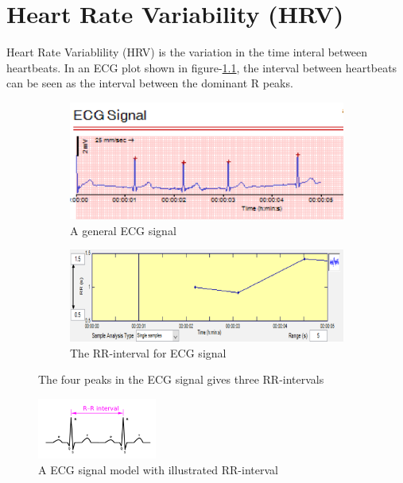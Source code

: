 \documentclass[a4paper, 11pt]{report}\usepackage[]{graphicx}\usepackage[]{color}
\numberwithin{figure}{section}
\begin{document}
\chapter{Heart Rate Variability (HRV)}
Heart Rate Variablility (HRV) is the variation in the time interal between heartbeats. In an ECG plot shown in figure-\ref{fig:ecgSignal}, the interval between heartbeats can be seen as the interval between the dominant R peaks.
\begin{figure}[H]
\centering
\begin{subfigure}[b]{0.49\textwidth}
  \includegraphics[width = \textwidth]{figure/ecg-1}
  \caption{A general ECG signal}
\end{subfigure}
\begin{subfigure}[b]{0.49\textwidth}
  \includegraphics[width = \textwidth]{figure/ecg-2}
  \caption{The RR-interval for ECG signal}
\end{subfigure}
\caption{The four peaks in the ECG signal gives three RR-intervals}
\label{fig:ecgSignal}
\end{figure}

\begin{figure}
\vspace{-10pt}
  \begin{center}
    \includegraphics[width=0.35\textwidth]{figure/ecg-3}
  \end{center}
  \caption{A ECG signal model with illustrated RR-interval} 
  \label{fig:modelECG}
  \vspace{-50pt}
\end{figure}
\end{document}
